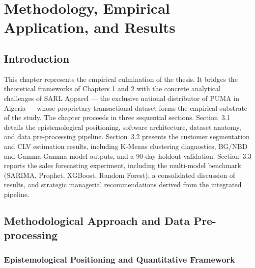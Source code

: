 
\chapter{\textbf{Methodology, Empirical Application, and Results}}

\section*{Introduction}

This chapter represents the empirical culmination of the thesis. It bridges the theoretical frameworks of Chapters 1 and 2 with the concrete analytical challenges of SARL Apparel — the exclusive national distributor of PUMA in Algeria — whose proprietary transactional dataset forms the empirical substrate of the study. The chapter proceeds in three sequential sections. Section~3.1 details the epistemological positioning, software architecture, dataset anatomy, and data pre-processing pipeline. Section~3.2 presents the customer segmentation and CLV estimation results, including K-Means clustering diagnostics, BG/NBD and Gamma-Gamma model outputs, and a 90-day holdout validation. Section~3.3 reports the sales forecasting experiment, including the multi-model benchmark (SARIMA, Prophet, XGBoost, Random Forest), a consolidated discussion of results, and strategic managerial recommendations derived from the integrated pipeline.

\section{Methodological Approach and Data Pre-processing}

\subsection{Epistemological Positioning and Quantitative Framework}


